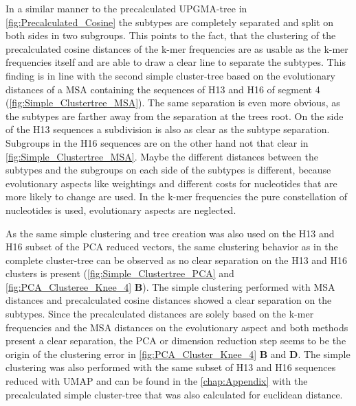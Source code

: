 In a similar manner to the precalculated \gls{UPGMA}-tree in \autoref{fig:Precalculated_Cosine} the subtypes are completely separated and split on both sides in two subgroups. This points to the fact, that the clustering of the precalculated cosine distances of the k-mer frequencies are as usable as the k-mer frequencies itself and are able to draw a clear line to separate the subtypes. This finding is in line with the second simple cluster-tree based on the evolutionary distances of a \gls{MSA} containing the sequences of H13 and H16 of segment 4 (\autoref{fig:Simple_Clustertree_MSA}). The same separation is even more obvious, as the subtypes are farther away from the separation at the trees root. On the side of the H13 sequences a subdivision is also as clear as the subtype separation. Subgroups in the H16 sequences are on the other hand not that clear in \autoref{fig:Simple_Clustertree_MSA}. Maybe the different distances between the subtypes and the subgroups on each side of the subtypes is different, because evolutionary aspects like weightings and different costs for nucleotides that are more likely to change are used. In the k-mer frequencies the pure constellation of nucleotides is used, evolutionary aspects are neglected.  

As the same simple clustering and tree creation was also used on the H13 and H16 subset of the \gls{PCA} reduced vectors, the same clustering behavior as in the complete cluster-tree can be observed as no clear separation on the H13 and H16 clusters is present (\autoref{fig:Simple_Clustertree_PCA} and \autoref{fig:PCA_Clusteree_Knee_4} \textbf{\textsf{B}}). The simple clustering performed with \gls{MSA} distances and precalculated cosine distances showed a clear separation on the subtypes. Since the precalculated distances are solely based on the k-mer frequencies and the \gls{MSA} distances on the evolutionary aspect and both methods present a clear separation, the \gls{PCA} or dimension reduction step seems to be the origin of the clustering error in \autoref{fig:PCA_Cluster_Knee_4} \textbf{\textsf{B}} and \textbf{\textsf{D}}. The simple clustering was also performed with the same subset of H13 and H16 sequences reduced with \gls{UMAP} and can be found in the \autoref{chap:Appendix} with the precalculated simple cluster-tree that was also calculated for euclidean distance.